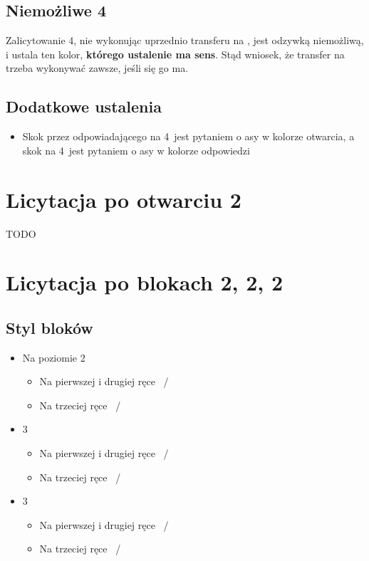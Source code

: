 \documentclass[12pt, a4paper]{article}
\begin{document}
\subsection{Niemożliwe 4\diams}
Zalicytowanie 4\diams, nie wykonując uprzednio transferu na \diams, jest odzywką niemożliwą, i ustala
ten kolor, \textbf{którego ustalenie ma sens}. Stąd wniosek, że transfer na \diams trzeba wykonywać zawsze, 
jeśli się go ma.

\subsection{Dodatkowe ustalenia}
\begin{itemize}
    \item Skok przez odpowiadającego na 4\clubs\ jest pytaniem o asy w kolorze otwarcia,
    a skok na 4\diams\ jest pytaniem o asy w kolorze odpowiedzi
\end{itemize}

\pagebreak
\section{Licytacja po otwarciu 2\clubs}
TODO


\pagebreak
\section{Licytacja po blokach 2\diams, 2\hearts, 2\spades}
\subsection{Styl bloków}
\begin{itemize}
    \item Na poziomie 2
    \begin{itemize}
        \item Na pierwszej i drugiej ręce \ / 
        \item Na trzeciej ręce \ /  
    \end{itemize}
    
    \item 3\clubs
    \begin{itemize}
        \item Na pierwszej i drugiej ręce \ / 
        \item Na trzeciej ręce \ /  
    \end{itemize}

    \item 3\diams\hearts\spades
    \begin{itemize}
        \item Na pierwszej i drugiej ręce \ / 
        \item Na trzeciej ręce \ /  
    \end{itemize}
\end{itemize}
\end{document}
